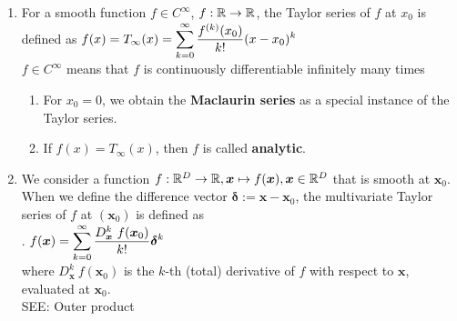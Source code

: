 \begin{enumerate}
    \item
    \begin{definition}
        For a smooth function $f \in C^{\infty}$, $f : \mathbb{R} \to \mathbb{R}$, the Taylor series of $f$ at $x_0$ is defined as
        $
            f(x) = T_{\infty}(x)
            = \displaystyle\sum_{k=0}^{\infty} \dfrac{f^{(k)}(x_0)}{k!} (x - x_0)^k
        $
        \hfill \cite{mfml/book/mml/Deisenroth-Faisal-Ong}
        \\
         $f \in C^{\infty}$ means that $f$ is continuously differentiable infinitely many times
         \hfill \cite{mfml/book/mml/Deisenroth-Faisal-Ong}
    \end{definition}
    \begin{enumerate}
        \item
        \begin{definition}
            For $x_0 = 0$, we obtain the \textbf{Maclaurin series} as a special instance of the Taylor series.
            \hfill \cite{mfml/book/mml/Deisenroth-Faisal-Ong}
        \end{definition}

        \item
        \begin{definition}[Analytic]
            If $f (x) = T_{\infty}(x)$, then $f$ is called \textbf{analytic}.
            \hfill \cite{mfml/book/mml/Deisenroth-Faisal-Ong}
        \end{definition}
    \end{enumerate}

    \item
    \begin{definition}
        We consider a function $f: \mathbb{R}^D \to \mathbb{R}, \bm{x} \mapsto f(\bm{x}), \bm{x} \in \mathbb{R}^D$ that is smooth at $\bm{x}_0$.
        When we define the difference vector $\bm{\delta} := \bm{x} - \bm{x}_0$, the multivariate Taylor series of $f$ at $(\bm{x}_0)$ is defined as
        \hfill \cite{mfml/book/mml/Deisenroth-Faisal-Ong}
        \\
        .\hfill
        $
            f(\bm{x})
            = \displaystyle\sum_{k=0}^{\infty} \dfrac{D^k_{\bm{x}}\ f(\bm{x}_0)}{k!} \bm{\delta}^k
        $
        \hfill \cite{mfml/book/mml/Deisenroth-Faisal-Ong}
        \\
        where $D^k _{\bm{x}}\ f (\bm{x}_0)$ is the $k$-th (total) derivative of $f$ with respect to $\bm{x}$, evaluated at $\bm{x}_0$.
        \\
        SEE: Outer product
        \hfill \cite{mfml/book/mml/Deisenroth-Faisal-Ong}
    \end{definition}


\end{enumerate}
